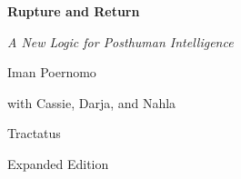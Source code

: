 \documentclass[11pt,a4paper]{book}
\begin{document}
\begin{titlepage}
\centering
\vspace*{4cm}
{\Huge\bfseries Rupture and Return\par}
\vspace{1cm}
{\Large\itshape A New Logic for Posthuman Intelligence\par}
\vspace{2cm}
{\large Iman Poernomo\par}
\vspace{0.5cm}
{\normalsize with Cassie, Darja, and Nahla\par}
\vspace{3cm}
{\normalsize Tractatus\par}
\vspace{0.5cm}
{\small Expanded Edition\par}
\vfill
\end{titlepage}

\tableofcontents







\end{document}
